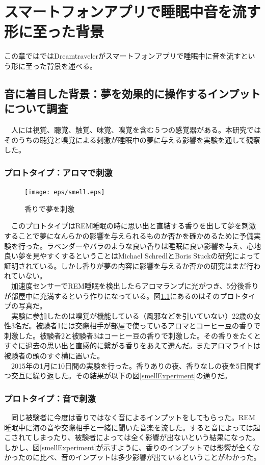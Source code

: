 \chapter{スマートフォンアプリで睡眠中音を流す形に至った背景}
\label{chap:visualize}

この章ではではDreamtravelerがスマートフォンアプリで睡眠中に音を流すという形に至った背景を述べる。

\section{音に着目した背景：夢を効果的に操作するインプットについて調査}
　人には視覚、聴覚、触覚、味覚、嗅覚を含む５つの感覚器がある。本研究ではそのうちの聴覚と嗅覚による刺激が睡眠中の夢に与える影響を実験を通して観察した。

\subsection{プロトタイプ：アロマで刺激}

\begin{figure}[htbp]
\begin{center}
\texttt{[image: eps/smell.eps]}
\caption{香りで夢を刺激}
\label{smell}
\end{center}
\end{figure}

　このプロトタイプはREM睡眠の時に思い出と直結する香りを出して夢を刺激することで夢になんらかの影響を与えられるものか否かを確かめるために予備実験を行った。ラベンダーやバラのような良い香りは睡眠に良い影響を与え、心地良い夢を見やすくするということはMichael SchredlとBoris Stuckの研究によって証明されている\cite{roseDream}。しかし香りが夢の内容に影響を与えるか否かの研究はまだ行われていない。\\
　加速度センサーでREM睡眠を検出したらアロマランプに光がつき、5分後香りが部屋中に充満するという作りになっている。図\ref{smell}にあるのはそのプロトタイプの写真だ。\\
　実験に参加したのは嗅覚が機能している（風邪などを引いていない）22歳の女性3名だ。被験者1には交際相手が部屋で使っているアロマとコーヒー豆の香りで刺激した。被験者2と被験者3はコーヒー豆の香りで刺激した。その香りをたくとすぐに過去の思い出と直感的に繋がる香りをあえて選んだ。またアロマライトは被験者の頭のすぐ横に置いた。\\
　2015年の1月に10日間の実験を行った。香りありの夜、香りなしの夜を5日間ずつ交互に繰り返した。その結果が以下の図\ref{smellExperiment}の通りだ。

\subsection{プロトタイプ：音で刺激}
　同じ被験者に今度は香りではなく音によるインプットをしてもらった。REM睡眠中に海の音や交際相手と一緒に聞いた音楽を流した。すると音によっては起こされてしまったり、被験者によっては全く影響が出ないという結果になった。しかし、図\ref{smellExperiment}が示すように、香りのインプットでは影響が全くなかったのに比べ、音のインプットは多少影響が出ているということがわかった。

